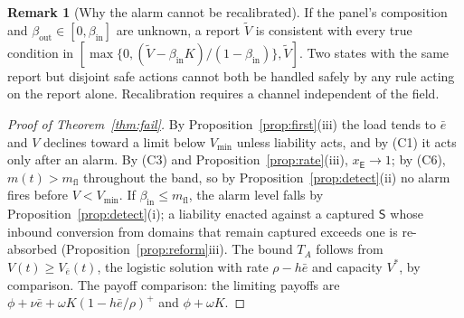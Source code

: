 \documentclass[letterpaper]{article} %
\theoremstyle{definition}
\newtheorem{remark}{Remark}
\newcommand{\dE}{\mathsf{E}}
\newcommand{\dS}{\mathsf{S}}
\newcommand{\Vmin}{V_{\min}}
\newcommand{\mfl}{m_{\mathrm{fl}}}
\begin{document}
\begin{remark}[Why the alarm cannot be recalibrated]\label{rem:indist}
If the panel's composition and $\beta_{\mathrm{out}}\in[0,\beta_{\mathrm{in}}]$ are unknown, a report $\tilde V$ is consistent with every true condition in $[\max\{0,(\tilde V-\beta_{\mathrm{in}}K)/(1-\beta_{\mathrm{in}})\},\tilde V]$. Two states with the same report but disjoint safe actions cannot both be handled safely by any rule acting on the report alone. Recalibration requires a channel independent of the field.
\end{remark}

\begin{proof}[Proof of Theorem~\ref{thm:fail}]
By Proposition~\ref{prop:first}(iii) the load tends to $\bar e$ and $V$ declines toward a limit below $\Vmin$ unless liability acts, and by (C1) it acts only after an alarm. By (C3) and Proposition~\ref{prop:rate}(iii), $x_\dE\to1$; by (C6), $m(t)>\mfl$ throughout the band, so by Proposition~\ref{prop:detect}(ii) no alarm fires before $V<\Vmin$. If $\beta_{\mathrm{in}}\le\mfl$, the alarm level falls by Proposition~\ref{prop:detect}(i); a liability enacted against a captured $\dS$ whose inbound conversion from domains that remain captured exceeds one is re-absorbed (Proposition~\ref{prop:reform}iii). The bound $T_A$ follows from $V(t)\ge V_{\bar e}(t)$, the logistic solution with rate $\rho-h\bar e$ and capacity $V^\ast$, by comparison. The payoff comparison: the limiting payoffs are $\phi+\nu\bar e+\omega K(1-h\bar e/\rho)^+$ and $\phi+\omega K$.
\end{proof}
\end{document}
